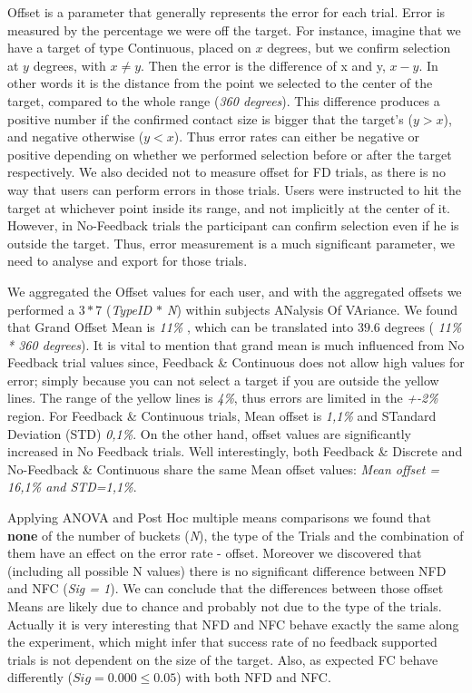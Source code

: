 Offset is a parameter that generally represents the error for each trial. Error is measured by the percentage we were off the target. For instance, imagine that we have a target of type Continuous, placed on $x$ degrees, but we confirm selection at $y$ degrees, with $x\neq y$. Then the error is the difference of x and y, $x-y$. In other words it is the distance from the point we selected to the center of the target, compared to the whole range (\emph{360 degrees}). 
This difference produces a positive number if the confirmed contact size is bigger that the target's ($y>x$), and negative otherwise ($y<x$). Thus error rates can either be negative or positive depending on whether we performed selection before or after the target respectively. 
We also decided not to measure offset for FD trials, as there is no way that users can perform errors in those trials. Users were instructed to hit the target at whichever point inside its range, and not implicitly at the center of it. 
However, in No-Feedback trials the participant can confirm selection even if he is outside the target. Thus, error measurement is a much significant parameter, we need to analyse and export for those trials.

We aggregated the Offset values for each user, and with the aggregated offsets we performed a $3 * 7$ (\emph{TypeID $*$ N}) within subjects ANalysis Of VAriance. We found that Grand Offset Mean is \emph{11\%} , which can be translated into $39.6$ degrees ( \emph{11\% * 360 degrees}).
It is vital to mention that grand mean is much influenced from No Feedback trial values since, Feedback \& Continuous does not allow high values for error; simply because you can not select a target if you are outside the yellow lines. 
The range of the yellow lines is \emph{4\%}, thus errors are limited in the \emph{+-2\%} region. 
For Feedback \& Continuous trials, Mean offset is \emph{1,1\%} and STandard Deviation (STD) \emph{0,1\%}.
On the other hand, offset values are significantly increased in No Feedback trials. Well interestingly, both Feedback \& Discrete and No-Feedback \& Continuous share the same Mean offset values: \emph{Mean offset = 16,1\% and STD=1,1\%}.


Applying ANOVA and Post Hoc multiple means comparisons we found that \textbf{none} of the number of buckets (\emph{N}), the type of the Trials and the combination of them have an effect on the error rate - offset. Moreover we discovered that (including all possible N values) there is no significant difference between NFD and NFC (\emph{Sig = 1}).
We can conclude that the differences between those offset Means are likely due to chance and probably not due to the type of the trials.
Actually it is very interesting that NFD and NFC behave exactly the same along the experiment, which might infer that success rate of no feedback supported trials is not dependent on the size of the target.
Also, as expected FC behave differently ($Sig=0.000 \leq 0.05$) with both NFD and NFC.

